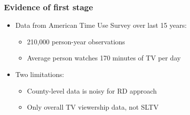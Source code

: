 \documentclass{beamer}
\begin{document}
\begin{frame}
\frametitle{Evidence of first stage}

\begin{itemize}

\item Data from American Time Use Survey over last 15 years:
\begin{itemize}
\item 210,000 person-year observations
\item Average person watches 170 minutes of TV per day
\end{itemize}

\vspace{10pt}
\item Two limitations:
\begin{itemize}
\item County-level data is noisy for RD approach
\item Only overall TV viewership data, not SLTV
\end{itemize}

\end{itemize}

\end{frame}
\end{document}
